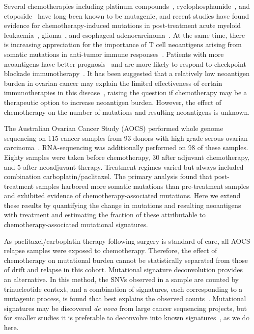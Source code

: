 Several chemotherapies including platinum compounds~\cite{Hannan_1989}, cyclophosphamide~\cite{Anderson_1995}, and etoposide~\cite{NAKANOMYO_1986} have long been known to be mutagenic, and recent studies have found evidence for chemotherapy-induced mutations in post-treatment acute myeloid leukaemia~\cite{Ding_2012}, glioma~\cite{Johnson_2013}, and esophageal adenocarcinoma~\cite{Murugaesu_2015}. At the same time, there is increasing appreciation for the importance of T cell neoantigens arising from somatic mutations in anti-tumor immune responses~\cite{Schumacher_2015}. Patients with more neoantigens have better prognosis~\cite{Brown_2014} and are more likely to respond to checkpoint blockade immunotherapy~\cite{Van_Allen_2015,Rizvi_2015}. It has been suggested that a relatively low neoantigen burden in ovarian cancer may explain the limited effectiveness of certain immunotherapies in this disease~\cite{Martin_2016}, raising the question if chemotherapy may be a therapeutic option to increase neoantigen burden. However, the effect of chemotherapy on the number of mutations and resulting neoantigens is unknown.

The Australian Ovarian Cancer Study (AOCS) performed whole genome sequencing on 115 cancer samples from 93 donors with high grade serous ovarian carcinoma~\cite{Patch_2015}. RNA-sequencing was additionally performed on 98 of these samples. Eighty samples were taken before chemotherapy, 30 after adjuvant chemotherapy, and 5 after neoadjuvant therapy. Treatment regimes varied but always included combination carboplatin/paclitaxel. The primary analysis found that post-treatment samples harbored more somatic mutations than pre-treatment samples and exhibited evidence of chemotherapy-associated mutations. Here we extend these results by quantifying the change in mutations and resulting neoantigens with treatment and estimating the fraction of these attributable to chemotherapy-associated mutational signatures.

As paclitaxel/carboplatin therapy following surgery is standard of care, all AOCS relapse samples were exposed to chemotherapy. Therefore, the effect of chemotherapy on mutational burden cannot be statistically separated from those of drift and relapse in this cohort. Mutational signature deconvolution provides an alternative. In this method, the SNVs observed in a sample are counted by trinucleotide context, and a combination of signatures, each corresponding to a mutagenic process, is found that best explains the observed counts~\cite{Alexandrov2013}. Mutational signatures may be discovered \textit{de novo} from large cancer sequencing projects, but for smaller studies it is preferable to deconvolve into known signatures~\cite{Rosenthal_2016}, as we do here.

